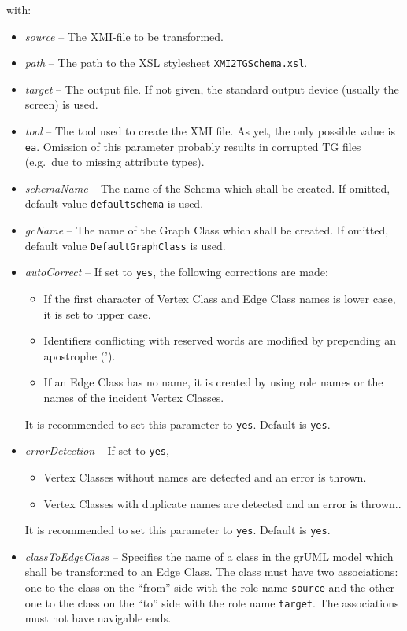 \documentclass[a4paper]{article}
\begin{document}
	with:
	\begin{itemize}
		\item \emph{source} -- The XMI-file to be transformed.
		\item \emph{path} -- The path to the XSL stylesheet \texttt{XMI2TGSchema.xsl}.
		\item \emph{target} -- The output file. If not given, the standard output device (usually the screen) is used.
		\item \emph{tool} -- The tool used to create the XMI file. As yet, the only possible value is \texttt{ea}. Omission of this parameter probably results in corrupted TG files (e.g.\ due to missing attribute types).
		\item \emph{schemaName} -- The name of the Schema which shall be created. If omitted, default value \texttt{default\-schema} is used.
		\item \emph{gcName} -- The name of the Graph Class which shall be created. If omitted, default value  \texttt{Default\-GraphClass} is used.
		\item \emph{autoCorrect} -- If set to \texttt{yes}, the following corrections are made:
		\begin{itemize}
			\item If the first character of Vertex Class and Edge Class names is lower case, it is set to upper case.
			\item Identifiers conflicting with reserved words are modified by prepending an apostrophe (').
			\item If an Edge Class has no name, it is created by using role names or the names of the incident Vertex Classes. 
		\end{itemize}
		It is recommended to set this parameter to \texttt{yes}. Default is \texttt{yes}.
		\item \emph{errorDetection} -- If set to \texttt{yes},
		\begin{itemize}
			\item Vertex Classes without names are detected and an error is thrown.
			\item Vertex Classes with duplicate names are detected and an error is thrown..
		\end{itemize}
		It is recommended to set this parameter to \texttt{yes}. Default is \texttt{yes}.
		\item \emph{classToEdgeClass} -- Specifies the name of a class in the grUML model which shall be transformed to an Edge Class. The class must have two associations: one to the class on the ``from'' side with the role name \texttt{source} and the other one to the class on the ``to'' side with the role name \texttt{target}. The associations must not have navigable ends.
	\end{itemize}

	
\end{document}
